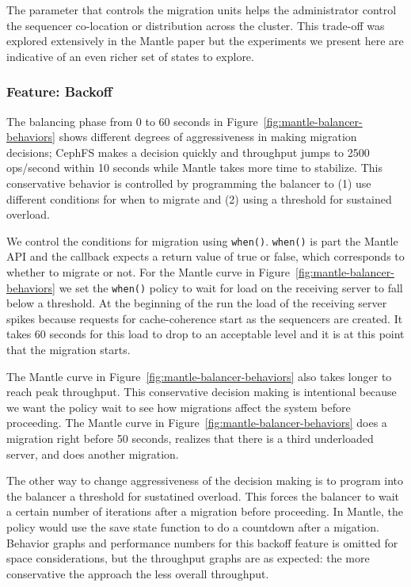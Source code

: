 \documentclass[preprint]{sigplanconf-eurosys}
\begin{document}
The parameter that controls the migration units helps the administrator control
the sequencer co-location or distribution across the cluster. This trade-off
was explored extensively in the Mantle paper but the experiments we present
here are indicative of an even richer set of states to explore.

\subsubsection{Feature: Backoff}
\label{sec:feature-backoff}

The balancing phase from 0 to 60 seconds in
Figure~\ref{fig:mantle-balancer-behaviors} shows different degrees of
aggressiveness in making migration decisions; CephFS makes a decision quickly
and throughput jumps to 2500 ops/second within 10 seconds while Mantle takes
more time to stabilize. This conservative behavior is controlled by programming
the balancer to (1) use different conditions for when to migrate and (2) using
a threshold for sustained overload. 

We control the conditions for migration using \texttt{when()}. \texttt{when()}
is part the Mantle API and the callback expects a return value of true or
false, which corresponds to whether to migrate or not. For the Mantle curve in
Figure~\ref{fig:mantle-balancer-behaviors} we set the \texttt{when()} policy to
wait for load on the receiving server to fall below a threshold. At the
beginning of the run the load of the receiving server spikes because requests
for cache-coherence start as the sequencers are created. It takes 60 seconds
for this load to drop to an acceptable level and it is at this point that the
migration starts. 

The Mantle curve in Figure~\ref{fig:mantle-balancer-behaviors} also takes longer
to reach peak throughput.  This conservative decision making is intentional
because we want the policy wait to see how migrations affect the system before
proceeding. The Mantle curve in Figure~\ref{fig:mantle-balancer-behaviors} does
a migration right before 50 seconds, realizes that there is a third underloaded
server, and does another migration. 

The other way to change aggressiveness of the decision making is to program
into the balancer a threshold for sustatined overload. This forces the balancer
to wait a certain number of iterations after a migration before proceeding. In
Mantle, the policy would use the save state function to do a countdown after a
migation.  Behavior graphs and performance numbers for this backoff feature is
omitted for space considerations, but the throughput graphs are as expected:
the more conservative the approach the less overall throughput.\\
 
\end{document}
